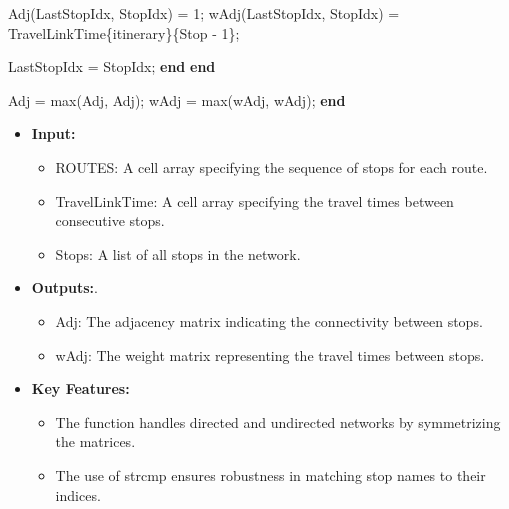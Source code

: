 \documentclass[
  letterpaper,
  DIV=11,
  numbers=noendperiod]{scrartcl}
\newenvironment{Shaded}{\begin{snugshade}}{\end{snugshade}}
\newcommand{\FloatTok}[1]{\textcolor[rgb]{0.68,0.00,0.00}{#1}}
\newcommand{\KeywordTok}[1]{\textcolor[rgb]{0.00,0.23,0.31}{\textbf{#1}}}
\newcommand{\NormalTok}[1]{\textcolor[rgb]{0.00,0.23,0.31}{#1}}
\newcommand{\OperatorTok}[1]{\textcolor[rgb]{0.37,0.37,0.37}{#1}}
\newcommand{\VariableTok}[1]{\textcolor[rgb]{0.07,0.07,0.07}{#1}}
\providecommand{\tightlist}{%
  \setlength{\itemsep}{0pt}\setlength{\parskip}{0pt}}\usepackage{longtable,booktabs,array}
\begin{document}
\begin{Shaded}
\begin{Highlighting}[]
            \VariableTok{Adj}\NormalTok{(}\VariableTok{LastStopIdx}\OperatorTok{,} \VariableTok{StopIdx}\NormalTok{) }\OperatorTok{=} \FloatTok{1}\OperatorTok{;}
            \VariableTok{wAdj}\NormalTok{(}\VariableTok{LastStopIdx}\OperatorTok{,} \VariableTok{StopIdx}\NormalTok{) }\OperatorTok{=} \VariableTok{TravelLinkTime}\NormalTok{\{}\VariableTok{itinerary}\NormalTok{\}\{}\VariableTok{Stop} \OperatorTok{{-}} \FloatTok{1}\NormalTok{\}}\OperatorTok{;}

            \VariableTok{LastStopIdx} \OperatorTok{=} \VariableTok{StopIdx}\OperatorTok{;}
        \KeywordTok{end}
    \KeywordTok{end}

    \VariableTok{Adj} \OperatorTok{=} \VariableTok{max}\NormalTok{(}\VariableTok{Adj}\OperatorTok{,} \VariableTok{Adj}\OperatorTok{\textquotesingle{}}\NormalTok{)}\OperatorTok{;}
    \VariableTok{wAdj} \OperatorTok{=} \VariableTok{max}\NormalTok{(}\VariableTok{wAdj}\OperatorTok{,} \VariableTok{wAdj}\OperatorTok{\textquotesingle{}}\NormalTok{)}\OperatorTok{;}
\KeywordTok{end}
\end{Highlighting}
\end{Shaded}

\begin{itemize}
\tightlist
\item
  \textbf{Input:}

  \begin{itemize}
  \tightlist
  \item
    ROUTES: A cell array specifying the sequence of stops for each
    route.
  \item
    TravelLinkTime: A cell array specifying the travel times between
    consecutive stops.
  \item
    Stops: A list of all stops in the network.
  \end{itemize}
\item
  \textbf{Outputs:}.

  \begin{itemize}
  \tightlist
  \item
    Adj: The adjacency matrix indicating the connectivity between stops.
  \item
    wAdj: The weight matrix representing the travel times between stops.
  \end{itemize}
\item
  \textbf{Key Features:}

  \begin{itemize}
  \tightlist
  \item
    The function handles directed and undirected networks by
    symmetrizing the matrices.
  \item
    The use of strcmp ensures robustness in matching stop names to their
    indices.
  \end{itemize}
\end{itemize}
\end{document}
